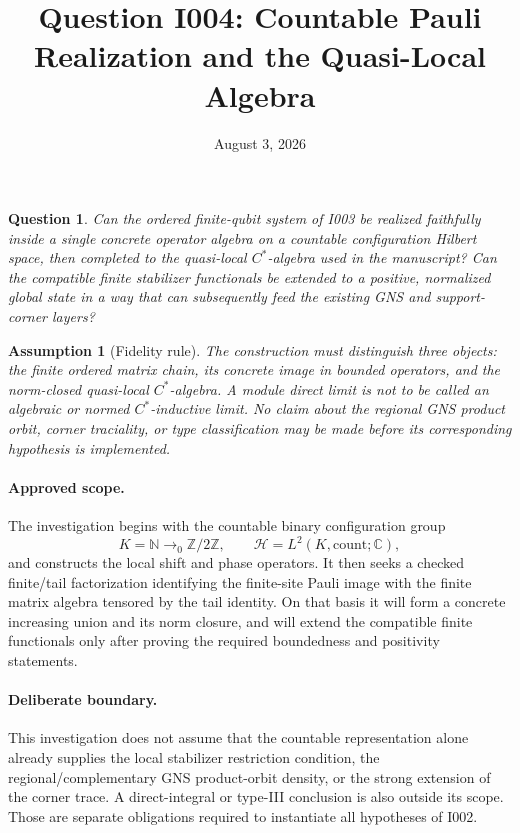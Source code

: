 \documentclass[11pt,reqno]{amsart}
\title{Question I004: Countable Pauli Realization and the Quasi-Local Algebra}
\date{August 3, 2026}
\newtheorem{question}{Question}
\newtheorem{assumption}{Assumption}
\newcommand{\cH}{\mathcal H}
\newcommand{\bbC}{\mathbb C}
\begin{document}
\maketitle

\begin{question}
Can the ordered finite-qubit system of I003 be realized faithfully inside a
single concrete operator algebra on a countable configuration Hilbert space,
then completed to the quasi-local $C^*$-algebra used in the manuscript?  Can
the compatible finite stabilizer functionals be extended to a positive,
normalized global state in a way that can subsequently feed the existing GNS
and support-corner layers?
\end{question}

\begin{assumption}[Fidelity rule]
The construction must distinguish three objects: the finite ordered matrix
chain, its concrete image in bounded operators, and the norm-closed
quasi-local $C^*$-algebra.  A module direct limit is not to be called an
algebraic or normed $C^*$-inductive limit.  No claim about the regional GNS
product orbit, corner traciality, or type classification may be made before
its corresponding hypothesis is implemented.
\end{assumption}

\paragraph{Approved scope.}
The investigation begins with the countable binary configuration group
\begin{equation}
  K=\mathbb N\to_0\mathbb Z/2\mathbb Z,
  \qquad
  \cH= L^2(K,\mathrm{count};\bbC),
  \label{eq:configuration_hilbert_space}
\end{equation}
and constructs the local shift and phase operators.  It then seeks a checked
finite/tail factorization identifying the finite-site Pauli image with the
finite matrix algebra tensored by the tail identity.  On that basis it will
form a concrete increasing union and its norm closure, and will extend the
compatible finite functionals only after proving the required boundedness and
positivity statements.

\paragraph{Deliberate boundary.}
This investigation does not assume that the countable representation alone
already supplies the local stabilizer restriction condition, the
regional/complementary GNS product-orbit density, or the strong extension of
the corner trace.  A direct-integral or type-III conclusion is also outside
its scope.  Those are separate obligations required to instantiate all
hypotheses of I002.
\end{document}
